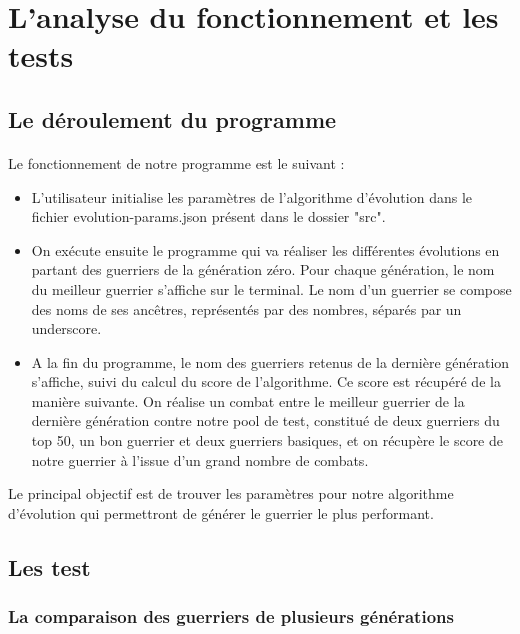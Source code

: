 \documentclass[french]{article}
\begin{document}
\clearpage

\section{L'analyse du fonctionnement et les tests}
    \subsection{Le déroulement du programme} 
        \paragraph{} Le fonctionnement de notre programme est le suivant : 
        \begin{itemize}
            \item L'utilisateur initialise les paramètres de l'algorithme d'évolution dans le fichier evolution-params.json présent dans le dossier "src". 
            \item On exécute ensuite le programme qui va réaliser les différentes évolutions en partant des guerriers de la génération zéro. Pour chaque génération, le nom du meilleur guerrier s'affiche sur le terminal. Le nom d'un guerrier se compose des noms de ses ancêtres, représentés par des nombres, séparés par un underscore. 
            \item A la fin du programme, le nom des guerriers retenus de la dernière génération s'affiche, suivi du calcul du score de l'algorithme. Ce score est récupéré de la manière suivante. On réalise un combat entre le meilleur guerrier de la dernière génération contre notre pool de test, constitué de deux guerriers du top 50, un bon guerrier et deux guerriers basiques, et on récupère le score de notre guerrier à l'issue d'un grand nombre de combats. 
        \end{itemize}
        Le principal objectif est de trouver les paramètres pour notre algorithme d'évolution qui permettront de générer le guerrier le plus performant.
        
    \subsection{Les test}
        \subsubsection{La comparaison des guerriers de plusieurs générations}
\end{document}
